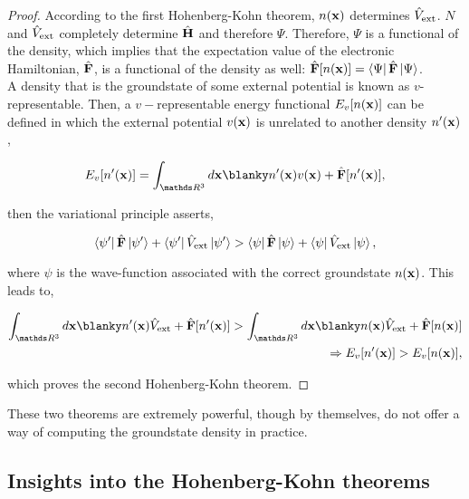 \documentclass{homework}
\begin{document}
\begin{proof}

According to the first Hohenberg-Kohn theorem, $n({\bf x})$ determines $\hat{V}_{\textnormal{ext}}$. $N$ and $\hat{V}_{\textnormal{ext}}$ completely determine $\hat{\bf H}$ and therefore $\Psi$. Therefore, $\Psi$ is a functional of the density, which implies that the expectation value of the electronic Hamiltonian, $\hat{\bf F}$, is a functional of the density as well: $\hat{\bf F} [n({\bf x})] = \bra{\Psi}\hat{\bf F}\ket{\Psi}$. \\

A density that is the groundstate of some external potential is known as $v$-representable. Then, a $v-$representable energy functional $E_{v}[n({\bf x})]$ can be defined in which the external potential $v({\bf x})$ is unrelated to another density $n'({\bf x})$,


\begin{align*}
    E_{v}[n'({\bf x})] = \int_{\R^3} d{\bf x} \blanky n'({\bf x}) v({\bf x}) + \hat{\bf F} [n'({\bf x})],
\end{align*}

then the variational principle asserts,

\begin{equation*}
    \bra{\psi'}\hat{\bf F}\ket{\psi'} + \bra{\psi'}\hat{V}_{\textnormal{ext}}\ket{\psi'} >  \bra{\psi}\hat{\bf F}\ket{\psi} + \bra{\psi}\hat{V}_{\textnormal{ext}}\ket{\psi},
\end{equation*}

where $\psi$ is the wave-function associated with the correct groundstate $n({\bf x})$. This leads to, 

\begin{align*}
     \int_{\R^3} d{\bf x} \blanky n'({\bf x})\hat{V}_{\textnormal{ext}} + \hat{\bf F} [n'({\bf x})] > \int_{\R^3} d{\bf x} \blanky n({\bf x})\hat{V}_{\textnormal{ext}} + \hat{\bf F} [n({\bf x})] \\
     \Rightarrow  E_{v}[n'({\bf x})] >  E_{v}[n({\bf x})],
\end{align*}

which proves the second Hohenberg-Kohn theorem. 

\end{proof}

These two theorems are extremely powerful, though by themselves, do not offer a way of computing the groundstate density in practice. \\

\subsection{Insights into the Hohenberg-Kohn theorems}
\end{document}
